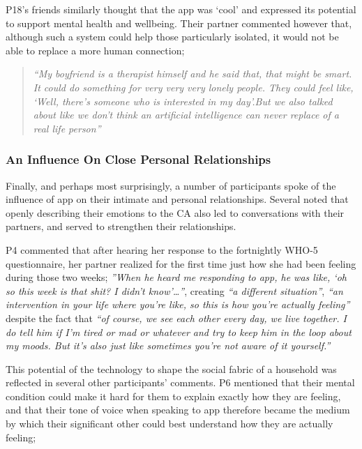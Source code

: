             P18's friends similarly thought that the \acl{app} was `cool' and expressed its potential to support mental health and wellbeing. Their partner commented however that, although such a system could help those particularly isolated, it would not be able to replace a more human connection;
            
                \begin{quote}
                \vspace{2mm}
                    \textit{``My boyfriend is a therapist himself and he said that, that might be smart. It could do something for very very very lonely people. They could feel like, `Well, there's someone who is interested in my day'.But we also talked about like we don't think an artificial intelligence can never replace of a real life person''} %
                \vspace{2mm}
                \end{quote} 
            
        \subsubsection{An Influence On Close Personal Relationships} %
        
            Finally, and perhaps most surprisingly, a number of participants spoke of the influence of \acl{app} on their intimate and personal relationships. Several noted that openly describing their emotions to the \ac{CA} also led to conversations with their partners, and served to strengthen their relationships.

            P4 commented that after hearing her response to the fortnightly \ac{WHO-5} questionnaire, her partner realized for the first time just how she had been feeling during those two weeks; \textit{''When he heard me responding to \acl{app}, he was like, `oh so this week is that shit? I didn't know'\ldots''}, creating \textit{``a different situation''}, \textit{``an intervention in your life where you're like, so this is how you're actually feeling''} despite the fact that \textit{``of course, we see each other every day, we live together. I do tell him if I'm tired or mad or whatever and try to keep him in the loop about my moods. But it's also just like sometimes you're not aware of it yourself.''} %
            
            This potential of the technology to shape the social fabric of a household was reflected in several other participants' comments. P6 mentioned that their mental condition could make it hard for them to explain exactly how they are feeling, and that their tone of voice when speaking to \acl{app} therefore became the medium by which their significant other could best understand how they are actually feeling;
            
